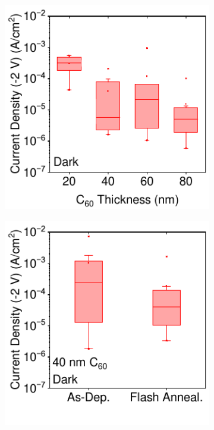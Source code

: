 \begin{figure}[ht!]
    \centering
    \begin{subfigure}[t]{0.45\textwidth} %
        \centering
        \includegraphics[width=\textwidth]{chapters/transport_layers/images/Thickness_Effect.pdf} %
        \caption{}
        \label{}
    \end{subfigure}
    \hfill %
    \begin{subfigure}[t]{0.45\textwidth} %
        \centering
        \includegraphics[width=\textwidth]{chapters/transport_layers/images/Annealing_Effect.pdf} %

\end{subfigure}
\end{figure}

